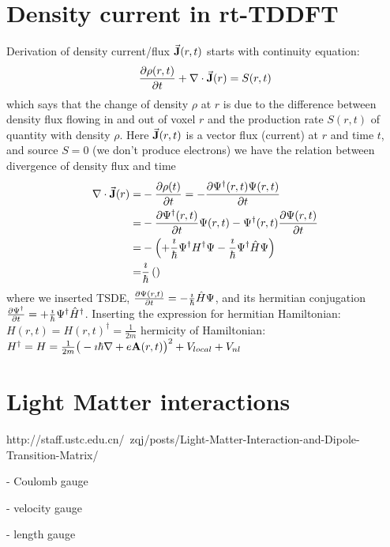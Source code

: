 \documentclass[11pt]{article}
\begin{document}
\section{Density current in  rt-TDDFT}

Derivation of density current/flux  $\vec {\vb J}(r,t)$   starts with  continuity  equation:
\begin{align}
\pdv{\rho(r,t)}{t} +  \nabla \cdot \vec {\vb J }(r) = S(r,t)
\end{align}
which says that the change of density  $\rho$ at $r$  is  due to the difference  between density flux flowing  in and out of voxel $r$ and the  production rate $S(r,t)$ of    quantity with density $\rho$.
Here $ \vec{ \vb J}(r,t) $ is  a vector flux (current)  at $r$ and time $t$,  and source $S=0$ (we don't produce electrons) we have the relation between divergence of density flux and time
\begin{align}
\nabla \cdot \vec {\vb J }(r) =&  -\pdv{\rho(t)}{t}= - \pdv{\Psi^\dag(r,t)
\Psi(r,t)}{t}  \\
= & -\pdv{\Psi^\dag(r,t)}{t} \Psi(r,t)    -\Psi^\dag(r,t) \pdv{\Psi(r,t)}{t} \\
= &- \left(+\frac{\imath}{ \hbar} \Psi^\dag H^\dag \Psi -\frac{\imath}{\hbar} \Psi^\dag \hat H  \Psi \right) \\
= & \frac{\imath}{\hbar} \left(\right)
\end{align}
where we inserted  TSDE,  $\pdv{\Psi(r,t)}{t} = -\frac{\imath}{\hbar} \hat H \Psi$,  and  its  hermitian conjugation  $\pdv{\Psi^\dag}{t}  = +\frac{\imath}{\hbar} \Psi^\dag \hat H^\dag $. Inserting the expression for hermitian Hamiltonian:
$H(r,t) =H(r,t)^\dag = \frac{1}{2m}$ %
hermicity of Hamiltonian: $H^\dag = H= \frac{1}{2m}  \big(-\imath \hbar \nabla +e {\vb A}(r,t)\big)^2 + V_{local} +V_{nl}$




\section{Light Matter interactions}

http://staff.ustc.edu.cn/~zqj/posts/Light-Matter-Interaction-and-Dipole-Transition-Matrix/

- Coulomb gauge 

- velocity gauge 

-  length gauge 

    
%


\newpage


%
\end{document}
